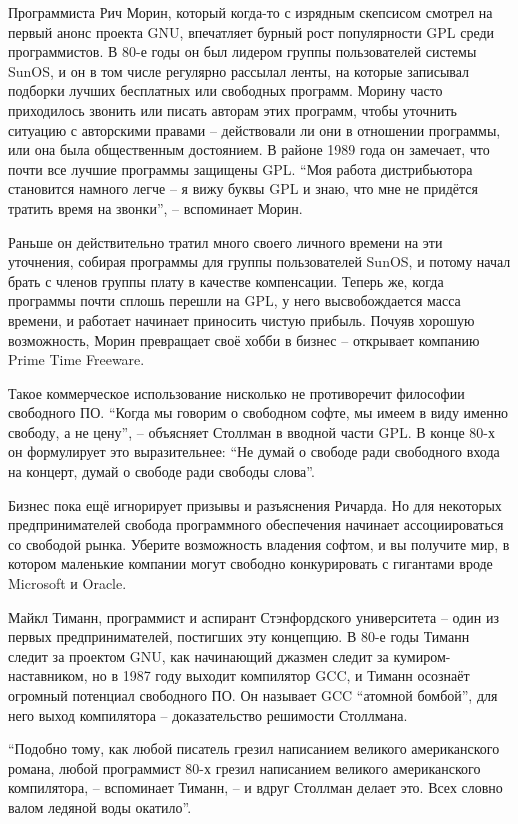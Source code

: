 Программиста Рич Морин, который когда-то с изрядным скепсисом смотрел на первый анонс проекта GNU, впечатляет бурный рост популярности GPL среди программистов. В 80-е годы он был лидером группы пользователей системы SunOS, и он в том числе регулярно рассылал ленты, на которые записывал подборки лучших бесплатных или свободных программ. Морину часто приходилось звонить или писать авторам этих программ, чтобы уточнить ситуацию с авторскими правами -- действовали ли они в отношении программы, или она была общественным достоянием. В районе 1989 года он замечает, что почти все лучшие программы защищены GPL. ``Моя работа дистрибьютора становится намного легче -- я вижу буквы GPL и знаю, что мне не придётся тратить время на звонки'', -- вспоминает Морин.

Раньше он действительно тратил много своего личного времени на эти уточнения, собирая программы для группы пользователей SunOS, и потому начал брать с членов группы плату в качестве компенсации. Теперь же, когда программы почти сплошь перешли на GPL, у него высвобождается масса времени, и работает начинает приносить чистую прибыль. Почуяв хорошую возможность, Морин превращает своё хобби в бизнес -- открывает компанию Prime Time Freeware.

Такое коммерческое использование нисколько не противоречит философии свободного ПО. ``Когда мы говорим о свободном софте, мы имеем в виду именно свободу, а не цену'', -- объясняет Столлман в вводной части GPL. В конце 80-х он формулирует это выразительнее: ``Не думай о свободе ради свободного входа на концерт, думай о свободе ради свободы слова''.

Бизнес пока ещё игнорирует призывы и разъяснения Ричарда. Но для некоторых предпринимателей свобода программного обеспечения начинает ассоциироваться со свободой рынка. Уберите возможность владения софтом, и вы получите мир, в котором маленькие компании могут свободно конкурировать с гигантами вроде Microsoft и Oracle.

Майкл Тиманн, программист и аспирант Стэнфордского университета -- один из первых предпринимателей, постигших эту концепцию. В 80-е годы Тиманн следит за проектом GNU, как начинающий джазмен следит за кумиром-наставником, но в 1987 году выходит компилятор GCC, и Тиманн осознаёт огромный потенциал свободного ПО. Он называет GCC ``атомной бомбой'', для него выход компилятора -- доказательство решимости Столлмана.

``Подобно тому, как любой писатель грезил написанием великого американского романа, любой программист 80-х грезил написанием великого американского компилятора, -- вспоминает Тиманн, -- и вдруг Столлман делает это. Всех словно валом ледяной воды окатило''.

